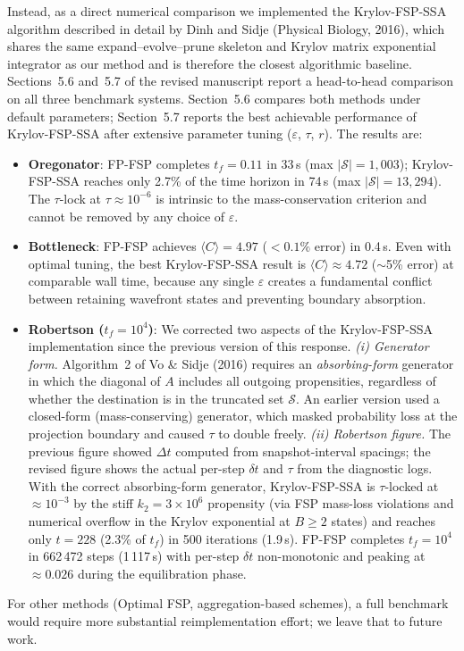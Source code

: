 \documentclass[11pt]{article}
\begin{document}
Instead, as a direct numerical comparison we implemented the Krylov-FSP-SSA
algorithm described in detail by Dinh and Sidje (Physical Biology, 2016), which
shares the same expand--evolve--prune skeleton and Krylov matrix exponential
integrator as our method and is therefore the closest algorithmic baseline. Sections~5.6
and~5.7 of the revised manuscript report a head-to-head comparison on all three
benchmark systems. Section~5.6 compares both methods under default parameters;
Section~5.7 reports the best achievable performance of Krylov-FSP-SSA after extensive
parameter tuning ($\varepsilon$, $\tau$, $r$). The results are:
\begin{itemize}
  \item \textbf{Oregonator}: FP-FSP completes $t_f = 0.11$ in 33\,s (max $|\mathcal{S}|{=}1{,}003$);
        Krylov-FSP-SSA reaches only 2.7\% of the time horizon in 74\,s
        (max $|\mathcal{S}|{=}13{,}294$). The $\tau$-lock at $\tau \approx 10^{-6}$ is
        intrinsic to the mass-conservation criterion and cannot be removed by any
        choice of $\varepsilon$.
  \item \textbf{Bottleneck}: FP-FSP achieves $\langle C \rangle = 4.97$ ($<0.1\%$ error)
        in 0.4\,s. Even with optimal tuning, the best Krylov-FSP-SSA result is
        $\langle C \rangle \approx 4.72$ ($\sim$5\% error) at comparable wall time,
        because any single $\varepsilon$ creates a fundamental conflict between
        retaining wavefront states and preventing boundary absorption.
  \item \textbf{Robertson ($t_f{=}10^4$)}: We corrected two aspects of the Krylov-FSP-SSA
        implementation since the previous version of this response. \emph{(i) Generator
        form.} Algorithm~2 of Vo \& Sidje (2016) requires an \emph{absorbing-form}
        generator in which the diagonal of $A$ includes all outgoing propensities,
        regardless of whether the destination is in the truncated set $\mathcal{S}$.
        An earlier version used a closed-form (mass-conserving) generator, which
        masked probability loss at the projection boundary and caused $\tau$ to double
        freely. \emph{(ii) Robertson figure.} The previous figure showed
        $\Delta t$ computed from snapshot-interval spacings; the revised figure shows
        the actual per-step $\delta t$ and $\tau$ from the diagnostic logs.
        With the correct absorbing-form generator, Krylov-FSP-SSA is $\tau$-locked
        at ${\approx}10^{-3}$ by the stiff $k_2 = 3\times10^6$ propensity (via FSP
        mass-loss violations and numerical overflow in the Krylov exponential at
        $B{\geq}2$ states) and reaches only $t = 228$ (2.3\% of $t_f$) in 500
        iterations (1.9\,s). FP-FSP completes $t_f = 10^4$ in 662\,472 steps
        (1\,117\,s) with per-step $\delta t$ non-monotonic and peaking at
        ${\approx}0.026$ during the equilibration phase.
\end{itemize}
For other methods (Optimal FSP, aggregation-based schemes), a full benchmark would
require more substantial reimplementation effort; we leave that to future work.
\end{document}
